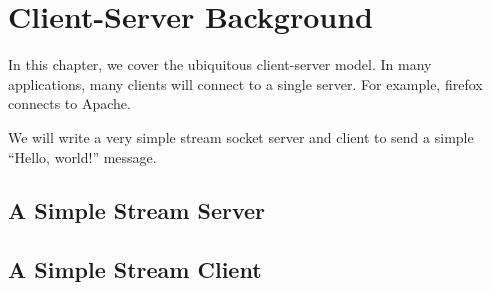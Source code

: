 \section{Client-Server Background}
In this chapter, we cover the ubiquitous client-server model. In many applications, many clients will connect to a single server. For example, firefox connects to Apache.

We will write a very simple stream socket server and client to send a simple ``Hello, world!'' message.

\subsection{A Simple Stream Server}

\subsection{A Simple Stream Client}
